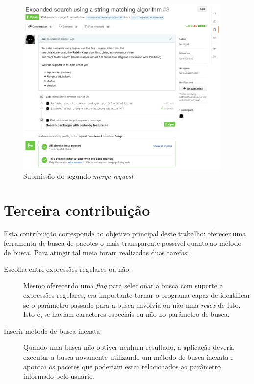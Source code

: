 \begin{figure}[h]
  \centering
	\includegraphics[width=0.95\textwidth]{figuras/pr2}
  \caption{Submissão do segundo \textit{merge request}}
  \label{fig:pr2_travisok}
\end{figure}


\section{Terceira contribuição} %
\label{sec:terceira_contribui_o}

Esta contribuição corresponde ao objetivo principal deste trabalho: oferecer uma ferramenta de busca de pacotes o mais transparente possível quanto ao método de busca. Para atingir tal meta foram realizadas duas tarefas:

\begin{description}
	\item [Escolha entre expressões regulares ou não:] Mesmo oferecendo uma \textit{flag} para selecionar a busca com suporte a expressões regulares, era importante tornar o programa capaz de identificar se o parâmetro passado para a busca envolvia ou não uma \textit{regex} de fato. Isto é, se haviam caracteres especiais ou não no parâmetro de busca.
	\item [Inserir método de busca inexata:] Quando uma busca não obtiver nenhum resultado, a aplicação deveria executar a busca novamente utilizando um método de busca inexata e apontar os pacotes que poderiam estar relacionados ao parâmetro informado pelo usuário.
\end{description}


